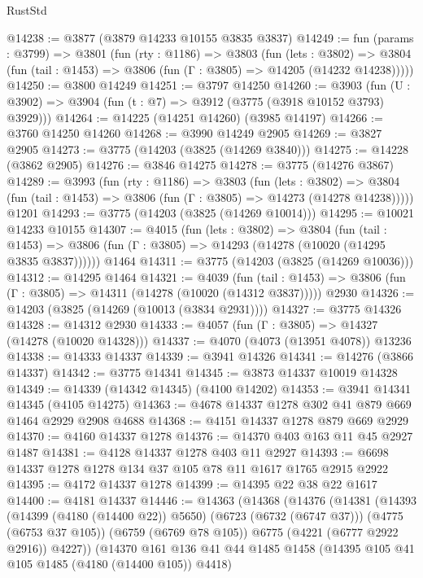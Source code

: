 \begin{lexlean}{RustStd}
\begin{coremodule}
@14238 := @3877 (@3879 @14233 @10155 @3835 @3837)
@14249 := fun (params : @3799) =>
  @3801
    (fun (rty : @1186) =>
    @3803
      (fun (lets : @3802) =>
      @3804 (fun (tail : @1453) => @3806 (fun (Γ : @3805) => @14205 (@14232 @14238)))))
@14250 := @3800 @14249
@14251 := @3797 @14250
@14260 := @3903
    (fun (U : @3902) => @3904 (fun (t : @7) => @3912 (@3775 (@3918 @10152 @3793) @3929)))
@14264 := @14225 (@14251 @14260) (@3985 @14197)
@14266 := @3760 @14250 @14260
@14268 := @3990 @14249 @2905
@14269 := @3827 @2905
@14273 := @3775 (@14203 (@3825 (@14269 @3840)))
@14275 := @14228 (@3862 @2905)
@14276 := @3846 @14275
@14278 := @3775 (@14276 @3867)
@14289 := @3993
    (fun (rty : @1186) =>
    @3803
      (fun (lets : @3802) =>
      @3804 (fun (tail : @1453) => @3806 (fun (Γ : @3805) => @14273 (@14278 @14238)))))
    @1201
@14293 := @3775 (@14203 (@3825 (@14269 @10014)))
@14295 := @10021 @14233 @10155
@14307 := @4015
    (fun (lets : @3802) =>
    @3804
      (fun (tail : @1453) =>
      @3806 (fun (Γ : @3805) => @14293 (@14278 (@10020 (@14295 @3835 @3837))))))
    @1464
@14311 := @3775 (@14203 (@3825 (@14269 @10036)))
@14312 := @14295 @1464
@14321 := @4039
    (fun (tail : @1453) => @3806 (fun (Γ : @3805) => @14311 (@14278 (@10020 (@14312 @3837)))))
    @2930
@14326 := @14203 (@3825 (@14269 (@10013 (@3834 @2931))))
@14327 := @3775 @14326
@14328 := @14312 @2930
@14333 := @4057 (fun (Γ : @3805) => @14327 (@14278 (@10020 @14328)))
@14337 := @4070 (@4073 (@13951 @4078)) @13236
@14338 := @14333 @14337
@14339 := @3941 @14326
@14341 := @14276 (@3866 @14337)
@14342 := @3775 @14341
@14345 := @3873 @14337 @10019 @14328
@14349 := @14339 (@14342 @14345) (@4100 @14202)
@14353 := @3941 @14341 @14345 (@4105 @14275)
@14363 := @4678 @14337 @1278 @302 @41 @879 @669 @1464 @2929 @2908 @4688
@14368 := @4151 @14337 @1278 @879 @669 @2929
@14370 := @4160 @14337 @1278
@14376 := @14370 @403 @163 @11 @45 @2927 @1487
@14381 := @4128 @14337 @1278 @403 @11 @2927
@14393 := @6698 @14337 @1278 @1278 @134 @37 @105 @78 @11 @1617 @1765 @2915 @2922
@14395 := @4172 @14337 @1278
@14399 := @14395 @22 @38 @22 @1617
@14400 := @4181 @14337
@14446 := @14363
    (@14368
      (@14376
        (@14381
          (@14393
            (@14399 (@4180 (@14400 @22)) @5650)
            (@6723 (@6732 (@6747 @37)))
            (@4775 (@6753 @37 @105))
            (@6759 (@6769 @78 @105))
            @6775
            (@4221 (@6777 @2922 @2916))
            @4227))
        (@14370
          @161
          @136
          @41
          @44
          @1485
          @1458
          (@14395 @105 @41 @105 @1485 (@4180 (@14400 @105)) @4418)

\end{coremodule}
\end{lexlean}
